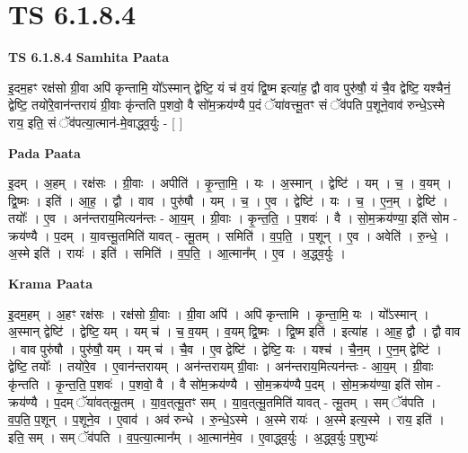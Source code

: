 \documentclass[17pt]{extarticle}
\begin{document}
\section{ TS 6.1.8.4 }

\textbf{TS 6.1.8.4 } \newline
\textbf{Samhita Paata} \newline

इ॒दम॒हꣳ रक्ष॑सो ग्री॒वा अपि॑ कृन्तामि॒ यो᳚ऽस्मान् द्वेष्टि॒ यं च॑ व॒यं द्वि॒ष्म इत्या॑ह॒ द्वौ वाव पुरु॑षौ॒ यं चै॒व द्वेष्टि॒ यश्चैनं॒ द्वेष्टि॒ तयो॑रे॒वान॑न्तरायं ग्री॒वाः कृ॑न्तति प॒शवो॒ वै सो॑म॒क्रय॑ण्यै प॒दं ॅया॑वत्त्मू॒तꣳ सं ॅव॑पति प॒शूने॒वाव॑ रुन्धे॒ऽस्मे राय॒ इति॒ सं ॅव॑पत्या॒त्मान॑-मे॒वाद्ध्व॒र्युः - [  ] \newline

\textbf{Pada Paata} \newline

इ॒दम् । अ॒हम् । रक्ष॑सः । ग्री॒वाः । अपीति॑ । कृ॒न्ता॒मि॒ । यः । अ॒स्मान् । द्वेष्टि॑ । यम् । च॒ । व॒यम् । द्वि॒ष्मः । इति॑ । आ॒ह॒ । द्वौ । वाव । पुरु॑षौ । यम् । च॒ । ए॒व । द्वेष्टि॑ । यः । च॒ । ए॒न॒म् । द्वेष्टि॑ । तयोः᳚ । ए॒व । अन॑न्तराय॒मित्यन॑न्तः - आ॒य॒म् । ग्री॒वाः । कृ॒न्त॒ति॒ । प॒शवः॑ । वै । सो॒म॒क्रय॑ण्या॒ इति॑ सोम - क्रय॑ण्यै । प॒दम् । या॒वत्त्मू॒तमिति॑ यावत् - त्मू॒तम् । समिति॑ । व॒प॒ति॒ । प॒शून् । ए॒व । अवेति॑ । रु॒न्धे॒ । अ॒स्मे इति॑ । रायः॑ । इति॑ । समिति॑ । व॒प॒ति॒ । आ॒त्मान᳚म् । ए॒व । अ॒द्ध्व॒र्युः ।  \newline


\textbf{Krama Paata} \newline

इ॒दम॒हम् । अ॒हꣳ रक्ष॑सः । रक्ष॑सो ग्री॒वाः । ग्री॒वा अपि॑ । अपि॑ कृन्तामि । कृ॒न्ता॒मि॒ यः । यो᳚ऽस्मान् । अ॒स्मान् द्वेष्टि॑ । द्वेष्टि॒ यम् । यम् च॑ । च॒ व॒यम् । व॒यम् द्वि॒ष्मः । द्वि॒ष्म इति॑ । इत्या॑ह । आ॒ह॒ द्वौ । द्वौ वाव । वाव पुरु॑षौ । पुरु॑षौ॒ यम् । यम् च॑ । चै॒व । ए॒व द्वेष्टि॑ । द्वेष्टि॒ यः । यश्च॑ । चै॒न॒म् । ए॒न॒म् द्वेष्टि॑ । द्वेष्टि॒ तयोः᳚ । तयो॑रे॒व । ए॒वान॑न्तरायम् । अन॑न्तरायम् ग्री॒वाः । अन॑न्तराय॒मित्यन॑न्तः - आ॒य॒म् । ग्री॒वाः कृ॑न्तति । कृ॒न्त॒ति॒ प॒शवः॑ । प॒शवो॒ वै । वै सो॑म॒क्रय॑ण्यै । सो॒म॒क्रय॑ण्यै प॒दम् । सो॒म॒क्रय॑ण्या॒ इति॑ सोम - क्रय॑ण्यै । प॒दम् ॅया॑वत्‌त्मू॒तम् । या॒व॒त्‌त्मू॒तꣳ सम् । या॒व॒त्‌त्मू॒तमिति॑ यावत् - त्मू॒तम् । सम् ॅव॑पति । व॒प॒ति॒ प॒शून् । प॒शूने॒व । ए॒वाव॑ । अव॑ रुन्धे । रु॒न्धे॒ऽस्मे । अ॒स्मे रायः॑ । अ॒स्मे इत्य॒स्मे । राय॒ इति॑ । इति॒ सम् । सम् ॅव॑पति । व॒प॒त्या॒त्मान᳚म् । आ॒त्मान॑मे॒व । ए॒वाद्ध्व॒र्युः । अ॒द्ध्व॒र्युः प॒शुभ्यः॑ \newline
\end{document}
